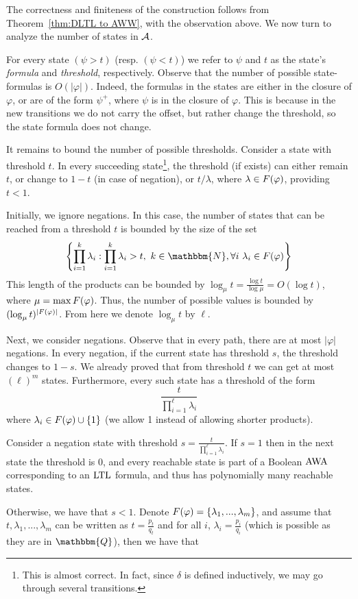 \documentclass{llncs}
\newcommand{\set}[1]{{\left\{#1\right\}}}
\newcommand{\Nat}{\mathbbm{N}}
\newcommand{\Rat}{\mathbbm{Q}}
\newcommand{\LTL}{{\ensuremath{\rm LTL}}\xspace}
\newcommand{\AWW}{\mbox{\rm AWA}\xspace}
\newcommand{\A}{{\cal A}}
\renewcommand{\phi}{\varphi}
\newcommand{\pos}[1]{{#1}^{+}}
\begin{document}
The correctness and finiteness of the construction follows from Theorem~\ref{thm:DLTL to AWW}, with the observation above. We now turn to analyze the number of states in $\A$.

For every state $(\psi > t)$ (resp. $(\psi<t)$) we refer to $\psi$ and $t$ as the state's {\em formula} and {\em threshold}, respectively. Observe that the number of possible state-formulas is $O(|\phi|)$.
Indeed, the formulas in the states are either in the closure of $\phi$, or are of the form $\pos{\psi}$, where $\psi$ is in the closure of $\phi$. This is because in the new transitions we do not carry the offset, but rather change the threshold, so the state formula does not change.

It remains to bound the number of possible thresholds.
Consider a state with threshold $t$. In every succeeding state\footnote{This is almost correct. In fact, since $\delta$ is defined inductively, we may go through several transitions.}, the threshold (if exists) can either remain $t$, or change to $1-t$ (in case of negation), or $t/\lambda$, where $\lambda\in \fac(\phi)$, providing $t <1$.

Initially, we ignore negations. In this case, the number of states that can be reached from a threshold $t$ is bounded by the size of the set
$$\set{\prod_{i=1}^k \lambda_i: \prod_{i=1}^k \lambda_i>t,\ k\in \Nat, \forall i\ \lambda_i\in \fac(\phi)}$$
This length of the products can be bounded by $\log_\mu t=\frac{\log t}{\log \mu}=O(\log t)$, where $\mu=\max\fac(\phi)$. Thus, the number of possible values is bounded by $(\log_\mu t) ^{|\fac(\phi)|}$.
From here we denote $\log_\mu t$ by $\ell$.

Next, we consider negations. Observe that in every path, there are at most $|\phi|$ negations. In every negation, if the current state has threshold $s$, the threshold changes to $1-s$. We already proved that from threshold $t$ we can get at most $(\ell) ^m$ states. Furthermore, every such state has a threshold of the form
$$\frac{t}{\prod_{i=1}^{\ell} \lambda_i}$$
where $\lambda_i\in\fac(\phi)\cup\set{1}$ (we allow 1 instead of allowing shorter products).

Consider a negation state with threshold $s=\frac{t}{\prod_{i=1}^{\ell} \lambda_i}$. If $s=1$ then in the next state the threshold is $0$, and every reachable state is part of a Boolean $\AWW$ corresponding to an $\LTL$ formula, and thus has polynomially many reachable states.

Otherwise, we have that $s<1$. Denote $\fac(\phi)=\set{\lambda_1,...,\lambda_m}$, and assume that $t,\lambda_1,...,\lambda_m$ can be written as $t=\frac{p_t}{q_t}$ and for all $i$, $\lambda_i=\frac{p_i}{q_i}$ (which is possible as they are in $\Rat$), then we have that
\end{document}
